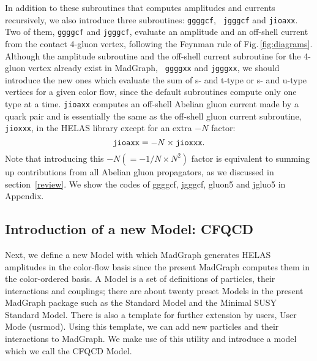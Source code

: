 In addition to these subroutines that computes amplitudes and currents
recursively, we also introduce three subroutines: {\tt ggggcf}, {\tt
jgggcf} and {\tt jioaxx}. Two of them, {\tt ggggcf} and {\tt jgggcf}, evaluate  an
amplitude and an off-shell current from the contact 4-gluon vertex,
following the Feynman rule of Fig.\,\ref{fig:diagrams}. Although
 the amplitude subroutine and the off-shell current subroutine for the 4-gluon vertex already exist in MadGraph, {\tt
ggggxx} and {\tt jgggxx}, we should introduce
the new ones which evaluate the sum of s- and t-type or s- and u-type
vertices
 for a given color flow, since the
default subroutines compute only one type at a time. {\tt jioaxx}
computes an off-shell Abelian gluon current made by a quark pair and is
essentially the same as the off-shell gluon current
 subroutine, {\tt jioxxx}, in the HELAS library\cite{HELAS} except for an extra $-N$ factor:
 \begin{equation}
  {\tt jioaxx} = -N \times {\tt jioxxx}.
\end{equation}
Note that introducing this $-N(=-1/N \times N^2)$ factor is equivalent to summing up
contributions from all  Abelian gluon propagators, as we discussed in section~\ref{review}. We show the codes
of ggggcf, jgggcf, gluon5 and jgluo5 in Appendix.

\subsection{Introduction of a new Model: CFQCD}
\label{cfqcd}
Next, we define a new Model with which MadGraph generates HELAS
amplitudes in the color-flow basis since the present MadGraph computes them in the color-ordered basis\cite{multiparton}.
 A Model is a
set of definitions of particles,
their interactions and couplings; there are about twenty preset Models in
the present MadGraph package\cite{MG/ME} such as the Standard Model and the
Minimal SUSY Standard Model\cite{MSSM}. There is also a
template for further extension by users, User Mode (usrmod). Using this template, we can add new particles and their
interactions to MadGraph. We make use of this utility and introduce a
model which we call the CFQCD Model.

